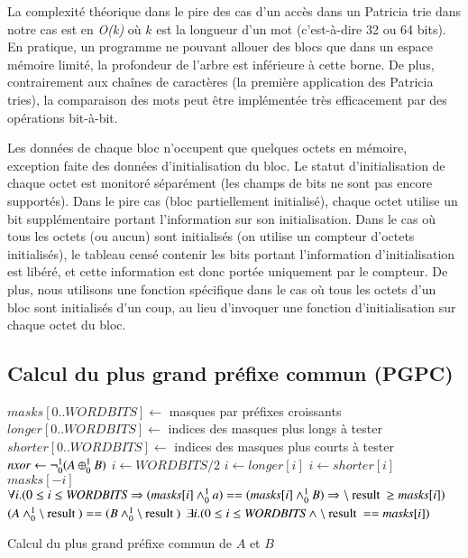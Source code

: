 La complexité théorique dans le pire des cas d'un accès dans un Patricia trie
dans notre cas est en {\em O(k)} où $k$ est la longueur d'un mot (c'est-à-dire
32 ou 64 bits).
En pratique, un programme ne pouvant allouer des blocs que dans un
espace mémoire limité, la profondeur de l'arbre est inférieure à cette borne.
De plus, contrairement aux chaînes de caractères (la première application des
Patricia tries), la comparaison des mots peut être implémentée très
efficacement par des opérations bit-à-bit.

Les données de chaque bloc n'occupent que quelques octets en mémoire, exception
faite des données d'initialisation du bloc.
Le statut d'initialisation de chaque octet est monitoré séparément (les champs
de bits ne sont pas encore supportés).
Dans le pire cas (bloc partiellement initialisé), chaque octet utilise un bit
supplémentaire portant l'information sur son initialisation.
Dans le cas où tous les octets (ou aucun) sont initialisés (on utilise un
compteur d'octets initialisés), le tableau censé contenir les bits portant
l'information d'initialisation est libéré, et cette information est donc portée
uniquement par le compteur.
De plus, nous utilisons une fonction spécifique dans le cas où tous les octets
d'un bloc sont initialisés d'un coup, au lieu d'invoquer une fonction
d'initialisation sur chaque octet du bloc.


\subsection{Calcul du plus grand préfixe commun (PGPC)}


%


\begin{algorithm}
\begin{algorithmic}
\State $\mathit{masks}[ 0 .. \mathit{WORDBITS} ] \gets$ masques par préfixes croissants
\State $\mathit{longer}[ 0 .. \mathit{WORDBITS} ] \gets$ indices des masques plus longs à tester
\State $\mathit{shorter}[ 0 .. \mathit{WORDBITS} ] \gets$ indices des masques plus courts à tester
\State $\mathit{nxor} \gets \lnot_0^1(A \oplus_0^1 B)$
\State $i \gets \mathit{WORDBITS}/2$
    \State $i \gets \mathit{longer}[i]$ 
  \Else
    \State $i \gets \mathit{shorter}[i]$
  \EndIf
\EndWhile\\
\Return $masks[-i]$
\Ensure $\forall i. (0 \le i \le \mathit{WORDBITS} \Rightarrow (\mathit{masks}[i] \Band a) == (\mathit{masks}[i] \Band B) \Rightarrow \mresult \ge \mathit{masks}[i])$
\Ensure $(A \Band \mresult) == (B \Band \mresult)$
\Ensure $\exists i. (0 \le i \le \mathit{WORDBITS} \land \mresult == \mathit{masks}[i])$
\end{algorithmic}
\caption{Calcul du plus grand préfixe commun de $A$ et $B$
  \label{algo:prefix}}
\end{algorithm}


